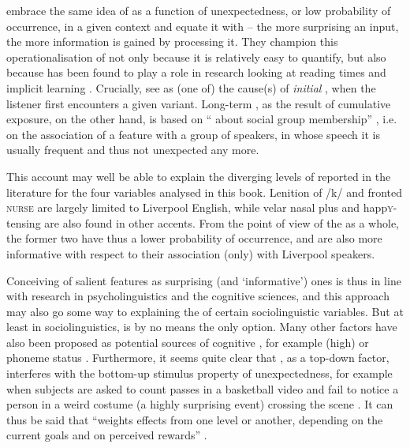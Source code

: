\textcite[cf.][37]{jaegeretal2017} embrace the same idea of  as a function of unexpectedness, or low probability of occurrence, in a given context and equate it with  -- the more surprising an input, the more information is gained by processing it.
They champion this operationalisation of  not only because it is relatively easy to quantify, but also because  has been found to play a role in research looking at reading times and implicit learning \parencite[cf.][37]{jaegeretal2017}.
Crucially, \citeauthor{jaegeretal2017} see  as (one of) the cause(s) of \emph{initial} , when the listener first encounters a given variant.
Long-term , as the result of cumulative exposure, on the other hand, is based on \enquote{ about social group membership} \parencite[38]{jaegeretal2017}, i.e. on the association of a feature with a group of speakers, in whose speech it is usually frequent and thus not unexpected any more.

This account may well be able to explain the diverging levels of  reported in the literature for the four variables analysed in this book.
Lenition of /k/ and fronted \textsc{nurse} are largely limited to Liverpool English, while velar nasal plus and happ\textsc{y}-tensing are also found in other accents.
From the point of view of the  as a whole, the former two have thus a lower probability of occurrence, and are also more informative with respect to their association (only) with Liverpool speakers.

Conceiving of salient features as surprising (and `informative') ones is thus in line with research in psycholinguistics and the cognitive sciences, and this approach may also go some way to explaining the  of certain sociolinguistic variables. 
But at least in sociolinguistics,  is by no means the only option.
Many other factors have also been proposed as potential sources of cognitive , for example (high)  or phoneme status \parencite[cf.][8]{auer2014}.
Furthermore, it seems quite clear that , as a top-down factor, interferes with the bottom-up stimulus property of unexpectedness, for example when subjects are asked to count passes in a basketball video and fail to notice a person in a weird costume (a highly surprising event) crossing the scene \parencite[cf.][8]{zarconeetal2017}.
It can thus be said that  \enquote{weights  effects from one level or another, depending on the current goals and on perceived rewards} \parencite[8]{zarconeetal2017}.

